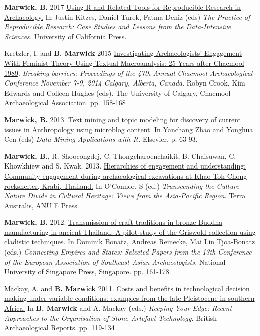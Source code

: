 \documentclass[11pt,article,oneside]{memoir}
\begin{document}
{{{{\ind \textbf{Marwick, B.} 2017 \href{https://www.practicereproducibleresearch.org/case-studies/benmarwick.html}{Using R and Related Tools for Reproducible Research in Archaeology.} In Justin Kitzes, Daniel Turek, Fatma Deniz (eds) \textit{The Practice of Reproducible Research: Case Studies and Lessons from the Data-Intensive Sciences.} University of California Press. 

\ind Kretzler, I. and \textbf{B. Marwick} 2015 \href{http://faculty.washington.edu/bmarwick/PDFs/Kretzler_Marwick_2014_Chacmool.pdf}{Investigating Archaeologists' Engagement With Feminist Theory Using Textual Macroanalysis: 25 Years after Chacmool 1989}. \textit{Breaking barriers: Proceedings of the 47th Annual Chacmool Archaeological Conference November 7-9, 2014 Calgary, Alberta, Canada}. Robyn Crook, Kim Edwards and Colleen Hughes (eds). The University of Calgary, Chacmool Archaeological Association. pp. 158-168

\ind \textbf{Marwick, B.} 2013. \href{http://faculty.washington.edu/bmarwick/PDFs/Marwick_2013_DMAR.pdf}{Text mining and topic modeling for discovery of current issues in Anthropology using microblog content.} In  Yanchang Zhao and Yonghua Cen (eds) \textit{Data Mining Applications with R.} Elsevier. p. 63-93.

\ind \textbf{Marwick, B.}, R. Shoocongdej, C. Thongcharoenchaikit, B. Chaisuwan, C. Khowkhiew and S. Kwak.  2013. \href{http://faculty.washington.edu/bmarwick/PDFs/Marwick_et_al_2013_community.pdf}{Hierarchies of engagement and understanding: Community engagement during archaeological excavations at Khao Toh Chong rockshelter, Krabi, Thailand.} In O’Connor, S (ed.) \textit{Transcending the Culture-Nature Divide in Cultural Heritage: Views from the Asia-Pacific Region}. Terra Australis, ANU E Press.

\ind \textbf{Marwick, B.} 2012. \href{http://faculty.washington.edu/bmarwick/PDFs/Marwick_2012_Buddha_cladistics.pdf}{Transmission of craft traditions in bronze Buddha manufacturing in ancient Thailand: A pilot study of the Griswold collection using cladistic techniques.} In Dominik Bonatz, Andreas Reinecke, Mai Lin Tjoa-Bonatz (eds.)\textit{ Connecting Empires and States: Selected Papers from the 13th Conference of the European Association of Southeast Asian Archaeologists.} National University of Singapore Press, Singapore. pp. 161-178.

\ind Mackay, A. and \textbf{B. Marwick} 2011. \href{http://faculty.washington.edu/bmarwick/PDFs/Mackay_and_Marwick_2011_timecost.pdf}{Costs and benefits in technological decision making under variable conditions: examples from the late Pleistocene in southern Africa.} In \textbf{B. Marwick} and A. Mackay (eds.) \textit{Keeping Your Edge: Recent Approaches to the Organisation of Stone Artefact Technology}. British Archaeological Reports.  pp. 119-134

}}}}
\end{document}
